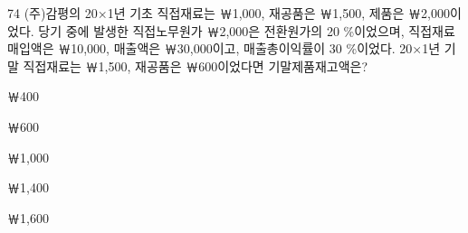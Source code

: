 \begin{question}{74}
(주)감평의 20×1년 기초 직접재료는 ￦1,000, 재공품은 ￦1,500, 제품은 ￦2,000이었다. 당기 중에 발생한 직접노무원가 ￦2,000은 전환원가의 20 \%이었으며, 직접재료 매입액은 ￦10,000, 매출액은 ￦30,000이고, 매출총이익률이 30 \%이었다. 20×1년 기말 직접재료는 ￦1,500, 재공품은 ￦600이었다면 기말제품재고액은?
\begin{choices}
  \item ￦400
  \item ￦600
  \item ￦1,000
  \item ￦1,400
  \item ￦1,600
\end{choices}
\end{question}

